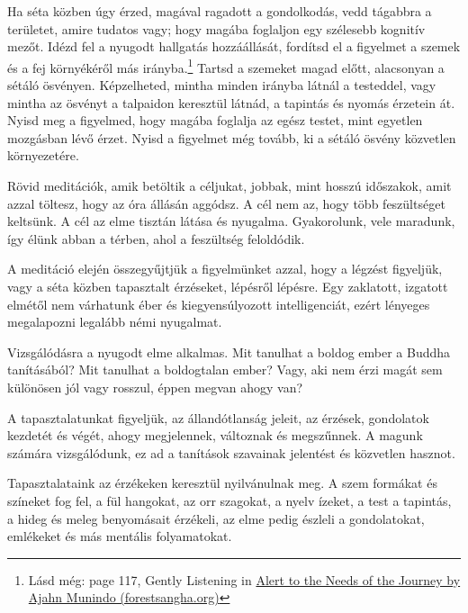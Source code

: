 \enlargethispage*{\baselineskip}

Ha séta közben úgy érzed, magával ragadott a gondolkodás, vedd tágabbra
a területet, amire tudatos vagy; hogy magába foglaljon egy szélesebb
kognitív mezőt. Idézd fel a nyugodt hallgatás hozzáállását, fordítsd el
a figyelmet a szemek és a fej környékéről más irányba.\footnote{Lásd
  még: page 117, Gently Listening in
  \href{https://forestsangha.org/teachings/books/alert-to-the-needs-of-the-journey?language=English}{Alert
  to the Needs of the Journey by Ajahn Munindo (forestsangha.org)}}
Tartsd a szemeket magad előtt, alacsonyan a sétáló ösvényen.
Képzelheted, mintha minden irányba látnál a testeddel, vagy mintha az
ösvényt a talpaidon keresztül látnád, a tapintás és nyomás érzetein át.
Nyisd meg a figyelmed, hogy magába foglalja az egész testet, mint
egyetlen mozgásban lévő érzet. Nyisd a figyelmet még tovább, ki a sétáló
ösvény közvetlen környezetére.

Rövid meditációk, amik betöltik a céljukat, jobbak, mint hosszú
időszakok, amit azzal töltesz, hogy az óra állásán aggódsz. A cél nem
az, hogy több feszültséget keltsünk. A cél az elme tisztán látása és
nyugalma. Gyakorolunk, vele maradunk, így élünk abban a térben, ahol a
feszültség feloldódik.


A meditáció elején összegyűjtjük a figyelmünket azzal, hogy a légzést
figyeljük, vagy a séta közben tapasztalt érzéseket, lépésről lépésre.
Egy zaklatott, izgatott elmétől nem várhatunk éber és kiegyensúlyozott
intelligenciát, ezért lényeges megalapozni legalább némi nyugalmat.

Vizsgálódásra a nyugodt elme alkalmas. Mit tanulhat a boldog ember a
Buddha tanításából? Mit tanulhat a boldogtalan ember? Vagy, aki nem érzi
magát sem különösen jól vagy rosszul, éppen megvan ahogy van?

A tapasztalatunkat figyeljük, az állandótlanság jeleit, az érzések,
gondolatok kezdetét és végét, ahogy megjelennek, változnak és
megszűnnek. A magunk számára vizsgálódunk, ez ad a tanítások szavainak
jelentést és közvetlen hasznot.

\enlargethispage*{\baselineskip}

Tapasztalataink az érzékeken keresztül nyilvánulnak meg. A szem formákat
és színeket fog fel, a fül hangokat, az orr szagokat, a nyelv ízeket, a
test a tapintás, a hideg és meleg benyomásait érzékeli, az elme pedig
észleli a gondolatokat, emlékeket és más mentális folyamatokat.

